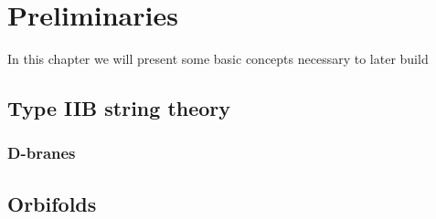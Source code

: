 

\chapter{Preliminaries}
\label{chap:preliminaries}
\pagestyle{fancy}

In this chapter we will present some basic concepts necessary to later build 

\section{Type IIB string theory}



\subsection{D-branes}

\section{Orbifolds}